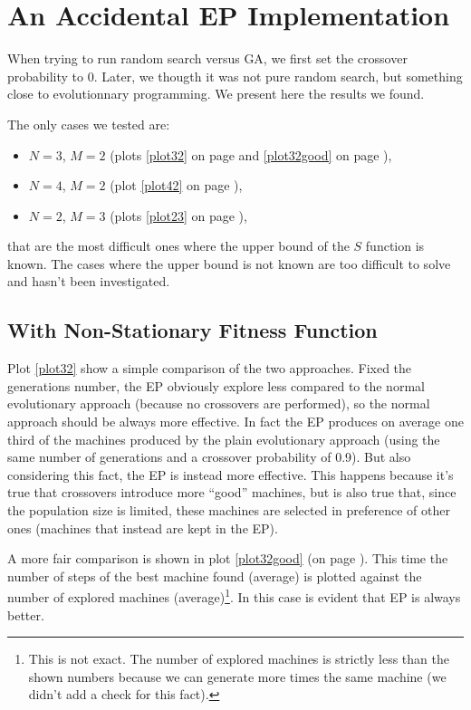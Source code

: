\section*{An Accidental EP Implementation}

When trying to run random search versus GA, we first set the crossover probability to 0. Later, we thougth it was not pure random search, but something close to evolutionnary programming. We present here the results we found.

The only cases we tested are:
\begin{itemize}
\item $N = 3$, $M = 2$ (plots \ref{plot32} on page \pageref{plot32} and \ref{plot32good} on page \pageref{plot32good}),
\item $N = 4$, $M = 2$ (plot \ref{plot42} on page \pageref{plot42}),
\item $N = 2$, $M = 3$ (plots \ref{plot23} on page \pageref{plot23}),
\end{itemize}

that are the most difficult ones where the upper bound of the $S$ function is known. The cases where the upper bound is not known are too difficult to solve and hasn't been investigated.


\subsection*{With Non-Stationary Fitness Function}
Plot \ref{plot32} show a simple comparison of the two approaches. %
Fixed the generations number, the EP obviously explore less compared to the normal evolutionary approach (because no crossovers are performed), so the normal approach should be always more effective. In fact the EP produces on average one third of the machines produced by the plain evolutionary approach (using the same number of generations and a crossover probability of 0.9).
But also considering this fact, the EP is instead more effective.
This happens because it's true that crossovers introduce more ``good'' machines, but is also true that, since the population size is limited, these machines are selected in preference of other ones (machines that instead are kept in the EP).

A more fair comparison is shown in plot \ref{plot32good} (on page \pageref{plot32good}). This time the number of steps of the best machine found (average) is plotted against the number of explored machines (average)\footnote{This is not exact. The number of explored machines is strictly less than the shown numbers because we can generate more times the same machine (we didn't add a check for this fact).}. In this case is evident that EP is always better.

